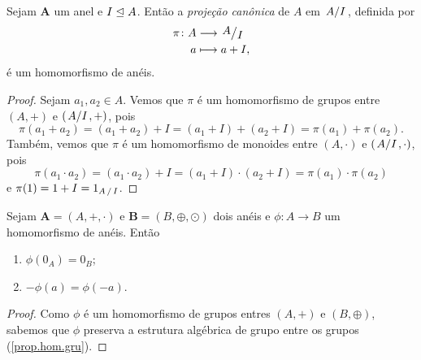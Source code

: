\begin{example}
Sejam $\bm A$ um anel e $I \mathrel{\unlhd} A$. Então a \emph{projeção canônica} de $A$ em $\quo{A}{I}$, definida por
	\begin{align*}
	\func{\pi}{A}{\quo{A}{I}}{a}{a+I},
	\end{align*}
é um homomorfismo de anéis.
\end{example}
\begin{proof}
	Sejam $a_1,a_2 \in A$. Vemos que $\pi$ é um homomorfismo de grupos entre $(A,+)$ e $(\quo{A}{I},+)$, pois
	\begin{equation*}
	\pi(a_1+a_2) = (a_1+a_2)+I = (a_1+I)+(a_2+I) = \pi(a_1)+\pi(a_2).
	\end{equation*}
Também, vemos que $\pi$ é um homomorfismo de monoides entre $(A,\cdot)$ e $(\quo{A}{I},\cdot)$, pois
	\begin{equation*}
	\pi(a_1 \cdot a_2) = (a_1 \cdot a_2)+I = (a_1+I) \cdot (a_2+I) = \pi(a_1) \cdot \pi(a_2)
	\end{equation*}
e $\pi(1)=1+I=1_{\quo{A}{I}}$.
\end{proof}

\begin{corollary}
	Sejam $\bm A=(A,+,\cdot)$ e $\bm B=(B,\oplus,\odot)$ dois anéis e $\phi: A \to B$ um homomorfismo de anéis. Então
	\begin{enumerate}
	\item $\phi(0_A)=0_B$;
	\item $-\phi(a)=\phi(-a)$.
	\end{enumerate}
\end{corollary}
\begin{proof}
	Como $\phi$ é um homomorfismo de grupos entres $(A,+)$ e $(B,\oplus)$, sabemos que $\phi$ preserva a estrutura algébrica de grupo entre os grupos (\ref{prop.hom.gru}).
\end{proof}

